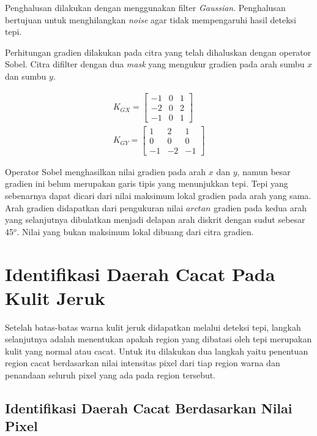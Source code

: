 \documentclass[laporan.tex]{subfiles}
\begin{document}
Penghalusan dilakukan dengan menggunakan filter \emph{Gaussian}. Penghalusan bertujuan untuk menghilangkan \emph{noise} agar tidak mempengaruhi hasil deteksi tepi.

Perhitungan gradien dilakukan pada citra yang telah dihaluskan dengan operator Sobel. Citra difilter dengan dua \emph{mask} yang mengukur gradien pada arah sumbu $x$ dan sumbu $y$.

\begin{equation}
\begin{split}
K_{GX} = \begin{bmatrix}
-1 & 0 & 1 \\
-2 & 0 & 2 \\
-1 & 0 & 1
\end{bmatrix}
\\
K_{GY} = \begin{bmatrix}
1 & 2 & 1 \\
0 & 0 & 0 \\
-1 & -2 & -1
\end{bmatrix}
\end{split}
\end{equation}

Operator Sobel menghasilkan nilai gradien pada arah $x$ dan $y$, namun besar gradien ini belum merupakan garis tipis yang menunjukkan tepi. Tepi yang sebenarnya dapat dicari dari nilai maksimum lokal gradien pada arah yang sama. Arah gradien didapatkan dari pengukuran nilai $arctan$ gradien pada kedua arah yang selanjutnya dibulatkan menjadi delapan arah diskrit dengan sudut sebesar 45$^o$. Nilai yang bukan maksimum lokal dibuang dari citra gradien.

\section{Identifikasi Daerah Cacat Pada Kulit Jeruk}

Setelah batas-batas warna kulit jeruk didapatkan melalui deteksi tepi, langkah selanjutnya adalah menentukan apakah region yang dibatasi oleh tepi merupakan kulit yang normal atau cacat. Untuk itu dilakukan dua langkah yaitu penentuan region cacat berdasarkan nilai intensitas pixel dari tiap region warna dan penandaan seluruh pixel yang ada pada region tersebut.

\subsection{Identifikasi Daerah Cacat Berdasarkan Nilai Pixel}
\end{document}
